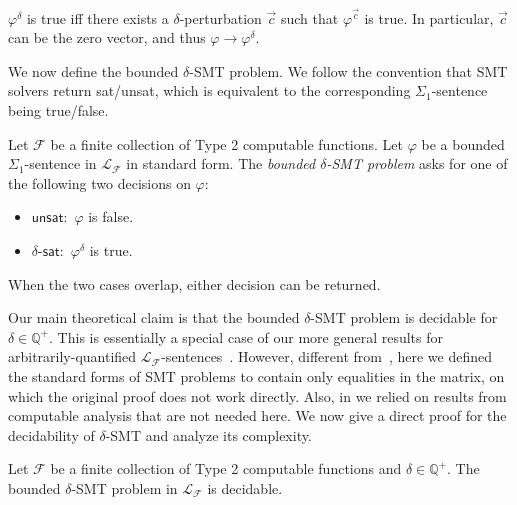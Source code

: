 \documentclass[envcountsect]{llncs}
\begin{document}
\begin{proposition} 
$\varphi^{\delta}$ is true iff there exists a $\delta$-perturbation $\vec c$ such that $\varphi^{\vec c}$ is true. In particular, $\vec c$ can be the zero vector, and thus $\varphi\rightarrow\varphi^{\delta}$. 
\end{proposition}

We now define the bounded $\delta$-SMT problem. We follow the convention that SMT solvers return sat/unsat, which is equivalent to the corresponding $\Sigma_1$-sentence being true/false. 


\begin{definition} Let $\mathcal{F}$ be a finite collection of Type 2 computable functions. Let $\varphi$ be a bounded $\Sigma_1$-sentence in $\mathcal{L}_{\mathcal{F}}$ in standard form. The {\em bounded $\delta$-SMT problem} asks for one of the following two decisions on $\varphi$:
\begin{itemize}
\item $\mathsf{unsat}:$ $\varphi$ is false.
\item $\delta$-$\mathsf{sat}:$ $\varphi^{\delta}$ is true. 
\end{itemize}
When the two cases overlap, either decision can be returned. 
\end{definition}

Our main theoretical claim is that the bounded $\delta$-SMT problem is decidable for $\delta\in \mathbb{Q}^+$. This is essentially a special case of our more general results for arbitrarily-quantified $\mathcal{L}_{\mathcal{F}}$-sentences~\cite{gaoextended2}. However, different from~\cite{gaoextended2}, here we defined the standard forms of SMT problems to contain only equalities in the matrix, on which the original proof does not work directly. Also, in \cite{gaoextended2} we relied on results from computable analysis that are not needed here. We now give a direct proof for the decidability of $\delta$-SMT and analyze its complexity. 

\begin{theorem}[Decidability] Let $\mathcal{F}$ be a finite collection of Type 2 computable functions and $\delta\in \mathbb{Q}^+$. The bounded $\delta$-SMT problem in $\mathcal{L}_{\mathcal{F}}$ is decidable.  
\end{theorem}
\end{document}

